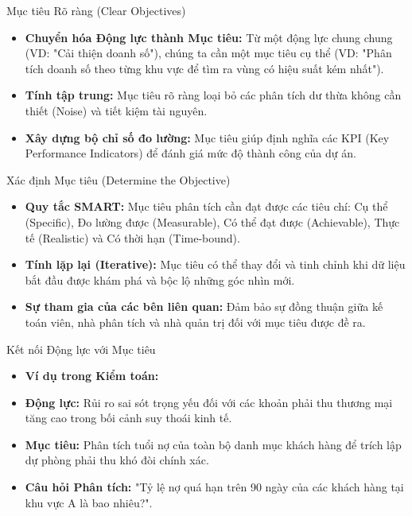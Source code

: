 \documentclass[aspectratio=169,12pt]{beamer}
\begin{document}
\begin{frame}{Mục tiêu Rõ ràng (Clear Objectives)}
\begin{itemize}
    \item \textbf{Chuyển hóa Động lực thành Mục tiêu:} Từ một động lực chung chung (VD: "Cải thiện doanh số"), chúng ta cần một mục tiêu cụ thể (VD: "Phân tích doanh số theo từng khu vực để tìm ra vùng có hiệu suất kém nhất").
    \item \textbf{Tính tập trung:} Mục tiêu rõ ràng loại bỏ các phân tích dư thừa không cần thiết (Noise) và tiết kiệm tài nguyên.
    \item \textbf{Xây dựng bộ chỉ số đo lường:} Mục tiêu giúp định nghĩa các KPI (Key Performance Indicators) để đánh giá mức độ thành công của dự án.
\end{itemize}
\end{frame}

\begin{frame}{Xác định Mục tiêu (Determine the Objective)}
\begin{itemize}
    \item \textbf{Quy tắc SMART:} Mục tiêu phân tích cần đạt được các tiêu chí: Cụ thể (Specific), Đo lường được (Measurable), Có thể đạt được (Achievable), Thực tế (Realistic) và Có thời hạn (Time-bound).
    \item \textbf{Tính lặp lại (Iterative):} Mục tiêu có thể thay đổi và tinh chỉnh khi dữ liệu bắt đầu được khám phá và bộc lộ những góc nhìn mới.
    \item \textbf{Sự tham gia của các bên liên quan:} Đảm bảo sự đồng thuận giữa kế toán viên, nhà phân tích và nhà quản trị đối với mục tiêu được đề ra.
\end{itemize}
\end{frame}

\begin{frame}{Kết nối Động lực với Mục tiêu}
\begin{itemize}
    \item \textbf{Ví dụ trong Kiểm toán:}
    \item \textbf{Động lực:} Rủi ro sai sót trọng yếu đối với các khoản phải thu thương mại tăng cao trong bối cảnh suy thoái kinh tế.
    \item \textbf{Mục tiêu:} Phân tích tuổi nợ của toàn bộ danh mục khách hàng để trích lập dự phòng phải thu khó đòi chính xác.
    \item \textbf{Câu hỏi Phân tích:} "Tỷ lệ nợ quá hạn trên 90 ngày của các khách hàng tại khu vực A là bao nhiêu?".
\end{itemize}
\end{frame}
\end{document}
